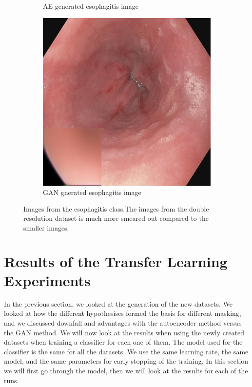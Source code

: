 \begin{figure}[t]
\begin{subfigure}[t]{\myfigsizethree}
            \caption{AE generated esophagitis image}    
            \label{fig:AE_512}
        \end{subfigure}
        \qquad
        \begin{subfigure}[t]{\myfigsizethree}  
            \centering 
            \includegraphics[width=\textwidth]{experiments/figures/512/cc.jpg}
            \caption{GAN gnerated esophagitis image}    
            \label{fig:GAN_512}
        \end{subfigure}
        \caption{Images from the esophagitis class.The images from the double resolution dataset is much more smeared out compared to the smaller images.} 
        \label{fig:AE_GAN_512}
    \end{figure}



   
\FloatBarrier
\section{Results of the Transfer Learning Experiments}In the previous section, we looked at the generation of the new datasets. We looked at how the different hypothesises formed the basis for different masking, and we discussed downfall and advantages with the autoencoder method versus the GAN method. 
We will now look at the results when using the newly created datasets when training a classifier for each one of them. 
The model used for the classifier is the same for all the datasets. We use the same learning rate, the same model, and the same parameters for early stopping of the training.  In this section we will first go through the model, then we will look at the results for each of the runs.


